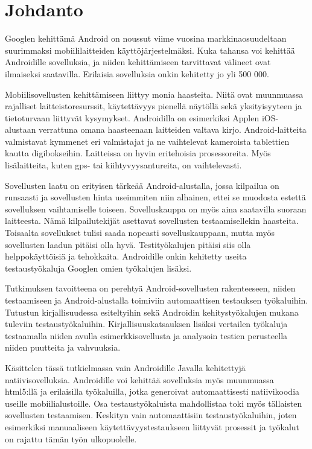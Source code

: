 \section{Johdanto}

Googlen kehittämä Android on noussut viime vuosina markkinaosuudeltaan suurimmaksi mobiililaitteiden käyttöjärjestelmäksi. Kuka tahansa voi kehittää Androidille sovelluksia, ja niiden kehittämiseen tarvittavat välineet ovat ilmaiseksi saatavilla. Erilaisia sovelluksia onkin kehitetty jo yli 500 000.

Mobiilisovellusten kehittämiseen liittyy monia haasteita. Niitä ovat muunmuassa rajalliset laitteistoresurssit, käytettävyys pienellä näytöllä sekä yksityisyyteen ja tietoturvaan liittyvät kysymykset. Androidilla on esimerkiksi Applen iOS-alustaan verrattuna omana haasteenaan laitteiden valtava kirjo. Android-laitteita valmistavat kymmenet eri valmistajat ja ne vaihtelevat kameroista tablettien kautta digibokseihin. Laitteissa on hyvin eritehoisia prosessoreita. Myös lisälaitteita, kuten gps- tai kiihtyvyysantureita, on vaihtelevasti.

Sovellusten laatu on erityisen tärkeää Android-alustalla, jossa kilpailua on runsaasti ja sovellusten hinta useimmiten niin alhainen, ettei se muodosta estettä sovelluksen vaihtamiselle toiseen. Sovelluskauppa on myös aina saatavilla suoraan laitteesta. Nämä kilpailutekijät asettavat sovellusten testaamisellekin haasteita. Toisaalta sovellukset tulisi saada nopeasti sovelluskauppaan, mutta myös sovellusten laadun pitäisi olla hyvä. Testityökalujen pitäisi siis olla helppokäyttöisiä ja tehokkaita. Androidille onkin kehitetty useita testaustyökaluja Googlen omien työkalujen lisäksi.

Tutkimuksen tavoitteena on perehtyä Android-sovellusten rakenteeseen, niiden testaamiseen ja Android-alustalla toimiviin automaattisen testauksen työkaluihin. Tutustun kirjallisuudessa esiteltyihin sekä Androidin kehitystyökalujen mukana tuleviin testaustyökaluihin. Kirjallisuuskatsauksen lisäksi vertailen työkaluja testaamalla niiden avulla esimerkkisovellusta ja analysoin testien perusteella niiden puutteita ja vahvuuksia.

Käsittelen tässä tutkielmassa vain Androidille Javalla kehitettyjä natiivisovelluksia. Androidille voi kehittää sovelluksia myös muunmuassa html5:llä ja erilaisilla työkaluilla, jotka generoivat automaattisesti natiivikoodia useille mobiilialustoille. Osa testaustyökaluista mahdollistaa toki myös tällaisten sovellusten testaamisen. Keskityn vain automaattisiin testaustyökaluihin, joten esimerkiksi manuaaliseen käytettävyystestaukseen liittyvät prosessit ja työkalut on rajattu tämän työn ulkopuolelle.

